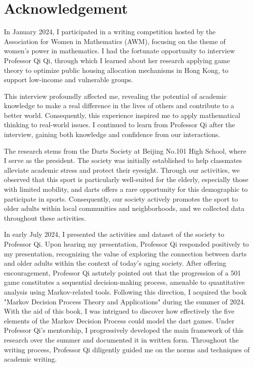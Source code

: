 \documentclass[cjjs]{ipart}
\theoremstyle{plain}
\begin{document}
\section*{Acknowledgement}
\text In January 2024, I participated in a writing competition hosted by the Association for Women in Mathematics (AWM), focusing on the theme of women's power in mathematics. I had the fortunate opportunity to interview Professor Qi Qi, through which I learned about her research applying game theory to optimize public housing allocation mechanisms in Hong Kong, to support low-income and vulnerable groups.

This interview profoundly affected me, revealing the potential of academic knowledge to make a real difference in the lives of others and contribute to a better world. Consequently, this experience inspired me to apply mathematical thinking to real-world issues. I continued to learn from Professor Qi after the interview, gaining both knowledge and confidence from our interactions.

The research stems from the Darts Society at Beijing No.101 High School, where I serve as the president. The society was initially established to help classmates alleviate academic stress and protect their eyesight. Through our activities, we observed that this sport is particularly well-suited for the elderly, especially those with limited mobility, and darts offers a rare opportunity for this demographic to participate in sports.
Consequently, our society actively promotes the sport to older adults within local communities and neighborhoods, and we collected data throughout these activities.

In early July 2024, I presented the activities and dataset of the society to Professor Qi. Upon hearing my presentation, Professor Qi responded positively to my presentation, recognizing the value of exploring the connection between darts and older adults within the context of today's aging society. After offering encouragement, Professor Qi astutely pointed out that the progression of a 501 game constitutes a sequential decision-making process, amenable to quantitative analysis using Markov-related tools. Following this direction, I acquired the book "Markov Decision Process Theory and Applications" during the summer of 2024. With the aid of this book, I was intrigued to discover how effectively the five elements of the Markov Decision Process could model the dart games. Under Professor Qi’s mentorship, I progressively developed the main framework of this research over the summer and documented it in written form. Throughout the writing process, Professor Qi diligently guided me on the norms and techniques of academic writing.
\end{document}

